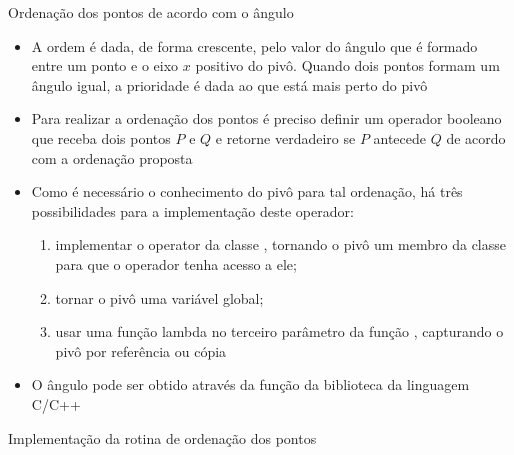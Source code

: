 \begin{frame}[fragile]{Ordenação dos pontos de acordo com o ângulo}

    \begin{itemize}
        \item A ordem é dada, de forma crescente, pelo valor do ângulo que é formado entre um
           ponto e o eixo $x$ positivo do pivô. Quando dois pontos formam um ângulo igual,
           a prioridade é dada ao que está mais perto do pivô

        \item Para realizar a ordenação dos pontos é preciso definir um operador booleano que
        receba dois pontos $P$ e $Q$ e retorne verdadeiro se $P$ antecede $Q$ de
        acordo com a ordenação proposta

        \item Como é necessário o conhecimento do pivô para tal ordenação, há três possibilidades 
            para a implementação deste operador:

        \begin{enumerate}
            \item implementar o operator  da classe , tornando o pivô um 
                membro da classe para que o operador tenha acesso a ele;
            \item tornar o pivô uma variável global;
            \item usar uma função lambda no terceiro parâmetro da função , 
                capturando o pivô por referência ou cópia
        \end{enumerate}

        \item O ângulo pode ser obtido através da função  da biblioteca  da linguagem C/C++
    \end{itemize}

\end{frame}



\begin{frame}[fragile]{Implementação da rotina de ordenação dos pontos}
\end{frame}

